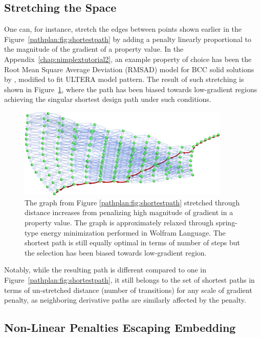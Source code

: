 \subsection{Stretching the Space} \label{pathplan:ssec:gradientstretch}

One can, for instance, stretch the edges between points shown earlier in the Figure~\ref{pathplan:fig:shortestpath} by adding a penalty linearly proportional to the magnitude of the gradient of a property value. In the Appendix~\ref{chap:nimplextutorial2}, an example property of choice has been the Root Mean Square Average Deviation (RMSAD) model for BCC solid solutions by \citet{Tandoc2023MiningAlloys}, modified to fit ULTERA model pattern. The result of such stretching is shown in Figure~\ref{pathplan:fig:lowgradient}, where the path has been biased towards low-gradient regions achieving the singular shortest design path under such conditions. 

\begin{figure}[H]
    \centering
    \includegraphics[width=0.9\textwidth]{pathplanning/InfeasibilityGliding_LowGradient.png}
    \caption{The graph from Figure \ref{pathplan:fig:shortestpath} stretched through distance increases from penalizing high magnitude of gradient in a property value. The graph is approximately relaxed through spring-type energy minimization performed in Wolfram Language. The shortest path is still equally optimal in terms of number of steps but the selection has been biased towards low-gradient region.}
    \label{pathplan:fig:lowgradient}
\end{figure}

Notably, while the resulting path is different compared to one in Figure~\ref{pathplan:fig:shortestpath}, it still belongs to the set of shortest paths in terms of un-stretched distance (number of transitions) for any scale of gradient penalty, as neighboring derivative paths are similarly affected by the penalty.

\subsection{Non-Linear Penalties Escaping Embedding} \label{pathplan:ssec:gradientsquare}

